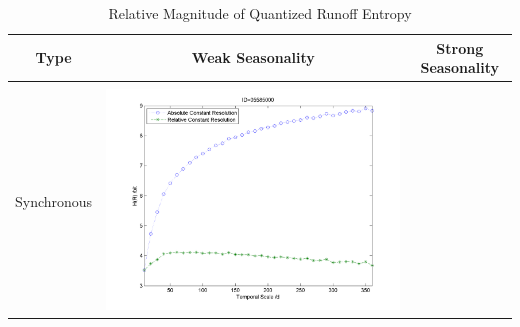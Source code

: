 \documentclass[11pt]{article}
\begin{document}
\begin{table}[H]\small
\caption{Relative Magnitude of Quantized Runoff Entropy}
\label{EN}
\resizebox{\textwidth}{!}
{
\centering
\begin{tabular}{ccc}

\toprule
Type& Weak Seasonality & Strong Seasonality \\\hline
\\
Synchronous
&\begin{minipage}{.6\textwidth}\includegraphics[width=\linewidth]{resultgraph/e05585000.png}\end{minipage}


\end{tabular}}
\end{table}
\end{document}
